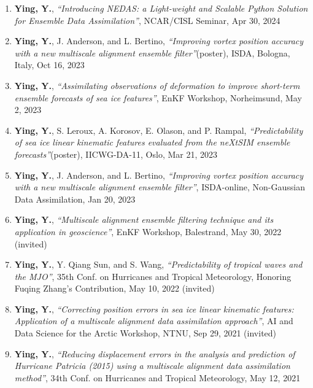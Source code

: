\begin{enumerate}
\item \textbf{Ying, Y.},
\textit{``Introducing NEDAS: a Light-weight and Scalable Python Solution for Ensemble Data Assimilation''},
NCAR/CISL Seminar, Apr 30, 2024

\item \textbf{Ying, Y.}, J. Anderson, and L. Bertino,
\textit{``Improving vortex position accuracy with a new multiscale alignment ensemble filter''}(poster),
ISDA, Bologna, Italy, Oct 16, 2023

\item \textbf{Ying, Y.},
\textit{``Assimilating observations of deformation to improve short-term ensemble forecasts of sea ice features''},
EnKF Workshop, Norheimsund, May 2, 2023

\item \textbf{Ying, Y.}, S. Leroux, A. Korosov, E. Olason, and P. Rampal,
\textit{``Predictability of sea ice linear kinematic features evaluated from the neXtSIM ensemble forecasts''}(poster),
IICWG-DA-11, Oslo, Mar 21, 2023

\item \textbf{Ying, Y.}, J. Anderson, and L. Bertino,
\textit{``Improving vortex position accuracy with a new multiscale alignment ensemble filter''},
ISDA-online, Non-Gaussian Data Assimilation, Jan 20, 2023

\item \textbf{Ying, Y.},
\textit{``Multiscale alignment ensemble filtering technique and its application in geoscience''},
EnKF Workshop, Balestrand, May 30, 2022
(invited)

\item \textbf{Ying, Y.}, Y. Qiang Sun, and S. Wang,
\textit{``Predictability of tropical waves and the MJO''},
35th Conf. on Hurricanes and Tropical Meteorology, Honoring Fuqing Zhang’s Contribution, May 10, 2022
(invited)

\item \textbf{Ying, Y.},
\textit{``Correcting position errors in sea ice linear kinematic features: Application of a multiscale alignment data assimilation approach''},
AI and Data Science for the Arctic Workshop, NTNU, Sep 29, 2021
(invited)

\item \textbf{Ying, Y.},
\textit{``Reducing displacement errors in the analysis and prediction of Hurricane Patricia (2015) using a multiscale alignment data assimilation method''},
34th Conf. on Hurricanes and Tropical Meteorology, May 12, 2021


\end{enumerate}

